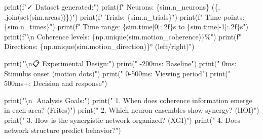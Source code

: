\documentclass[
  11pt,
  letterpaper,
  oneside,
  openany]{book}
\newenvironment{Shaded}{\begin{snugshade}}{\end{snugshade}}
\newcommand{\BuiltInTok}[1]{\textcolor[rgb]{0.00,0.23,0.31}{#1}}
\newcommand{\CharTok}[1]{\textcolor[rgb]{0.13,0.47,0.30}{#1}}
\newcommand{\DecValTok}[1]{\textcolor[rgb]{0.68,0.00,0.00}{#1}}
\newcommand{\NormalTok}[1]{\textcolor[rgb]{0.00,0.23,0.31}{#1}}
\newcommand{\OperatorTok}[1]{\textcolor[rgb]{0.37,0.37,0.37}{#1}}
\newcommand{\SpecialCharTok}[1]{\textcolor[rgb]{0.37,0.37,0.37}{#1}}
\newcommand{\SpecialStringTok}[1]{\textcolor[rgb]{0.13,0.47,0.30}{#1}}
\newcommand{\StringTok}[1]{\textcolor[rgb]{0.13,0.47,0.30}{#1}}
\begin{document}
\begin{Shaded}
\begin{Highlighting}[]
\BuiltInTok{print}\NormalTok{(}\SpecialStringTok{f"✓ Dataset generated:"}\NormalTok{)}
\BuiltInTok{print}\NormalTok{(}\SpecialStringTok{f"  Neurons: }\SpecialCharTok{\{}\NormalTok{sim}\SpecialCharTok{.}\NormalTok{n\_neurons}\SpecialCharTok{\}}\SpecialStringTok{ (}\SpecialCharTok{\{}\StringTok{\textquotesingle{}, \textquotesingle{}}\SpecialCharTok{.}\NormalTok{join(}\BuiltInTok{set}\NormalTok{(sim.areas))}\SpecialCharTok{\}}\SpecialStringTok{)"}\NormalTok{)}
\BuiltInTok{print}\NormalTok{(}\SpecialStringTok{f"  Trials: }\SpecialCharTok{\{}\NormalTok{sim}\SpecialCharTok{.}\NormalTok{n\_trials}\SpecialCharTok{\}}\SpecialStringTok{"}\NormalTok{)}
\BuiltInTok{print}\NormalTok{(}\SpecialStringTok{f"  Time points: }\SpecialCharTok{\{}\NormalTok{sim}\SpecialCharTok{.}\NormalTok{n\_times}\SpecialCharTok{\}}\SpecialStringTok{"}\NormalTok{)}
\BuiltInTok{print}\NormalTok{(}\SpecialStringTok{f"  Time range: }\SpecialCharTok{\{}\NormalTok{sim}\SpecialCharTok{.}\NormalTok{time[}\DecValTok{0}\NormalTok{]}\SpecialCharTok{:.2f\}}\SpecialStringTok{s to }\SpecialCharTok{\{}\NormalTok{sim}\SpecialCharTok{.}\NormalTok{time[}\OperatorTok{{-}}\DecValTok{1}\NormalTok{]}\SpecialCharTok{:.2f\}}\SpecialStringTok{s"}\NormalTok{)}
\BuiltInTok{print}\NormalTok{(}\SpecialStringTok{f"}\CharTok{\textbackslash{}n}\SpecialStringTok{  Coherence levels: }\SpecialCharTok{\{}\NormalTok{np}\SpecialCharTok{.}\NormalTok{unique(sim.motion\_coherence)}\SpecialCharTok{\}}\SpecialStringTok{\%"}\NormalTok{)}
\BuiltInTok{print}\NormalTok{(}\SpecialStringTok{f"  Directions: }\SpecialCharTok{\{}\NormalTok{np}\SpecialCharTok{.}\NormalTok{unique(sim.motion\_direction)}\SpecialCharTok{\}}\SpecialStringTok{° (left/right)"}\NormalTok{)}

\BuiltInTok{print}\NormalTok{(}\StringTok{"}\CharTok{\textbackslash{}n}\StringTok{📋 Experimental Design:"}\NormalTok{)}
\BuiltInTok{print}\NormalTok{(}\StringTok{"   {-}200ms: Baseline"}\NormalTok{)}
\BuiltInTok{print}\NormalTok{(}\StringTok{"      0ms: Stimulus onset (motion dots)"}\NormalTok{)}
\BuiltInTok{print}\NormalTok{(}\StringTok{"   0{-}500ms: Viewing period"}\NormalTok{)}
\BuiltInTok{print}\NormalTok{(}\StringTok{"   500ms+: Decision and response"}\NormalTok{)}

\BuiltInTok{print}\NormalTok{(}\StringTok{"}\CharTok{\textbackslash{}n}\StringTok{🎯 Analysis Goals:"}\NormalTok{)}
\BuiltInTok{print}\NormalTok{(}\StringTok{"   1. When does coherence information emerge in each area? (Frites)"}\NormalTok{)}
\BuiltInTok{print}\NormalTok{(}\StringTok{"   2. Which neuron ensembles show synergy? (HOI)"}\NormalTok{)}
\BuiltInTok{print}\NormalTok{(}\StringTok{"   3. How is the synergistic network organized? (XGI)"}\NormalTok{)}
\BuiltInTok{print}\NormalTok{(}\StringTok{"   4. Does network structure predict behavior?"}\NormalTok{)}
\end{Highlighting}
\end{Shaded}
\end{document}
